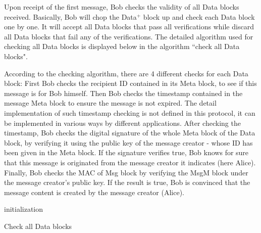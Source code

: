 Upon receipt of the first message, Bob checks the validity of all Data blocks received. Basically, Bob will chop the Data$^+$ block up and check each Data block one by one. It will accept all Data blocks that pass all verifications while discard all Data blocks that fail any of the verifications. The detailed algorithm used for checking all Data blocks is displayed below in the algorithm ``check all Data blocks".

According to the checking algorithm, there are 4 different checks for each Data block: First Bob checks the recipient ID contained in its Meta block, to see if this message is for Bob himself. Then Bob checks the timestamp contained in the message Meta block to ensure the message is not expired. The detail implementation of such timestamp checking is not defined in this protocol, it can be implemented in various ways by different applications. After checking the timestamp, Bob checks the digital signature of the whole Meta block of the Data block, by verifying it using the public key of the message creator - whose ID has been given in the Meta block. If the signature verifies true, Bob knows for sure that this message is originated from the message creator it indicates (here Alice). Finally, Bob checks the MAC of Msg block by verifying the MsgM block under the message creator's public key. If the result is true, Bob is convinced that the message content is created by the message creator (Alice).

\begin{algorithm}[H]
 initialization\;
\caption{Check all Data blocks}
\end{algorithm}
\bigskip
\bigskip

